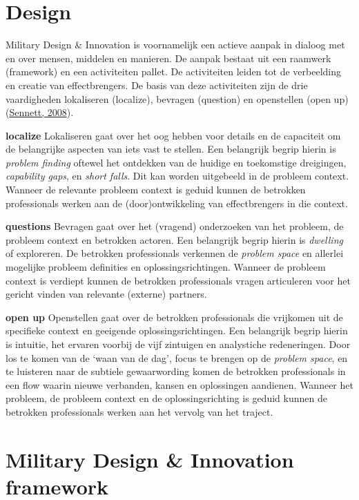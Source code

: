 \documentclass[
]{book}
\begin{document}
\hypertarget{design}{%
\section{Design}\label{design}}

Military Design \& Innovation is voornamelijk een actieve aanpak in dialoog met en over mensen, middelen en manieren. De aanpak bestaat uit een raamwerk (framework) en een activiteiten pallet. De activiteiten leiden tot de verbeelding en creatie van effectbrengers. De basis van deze activiteiten zijn de drie vaardigheden lokaliseren (localize), bevragen (question) en openstellen (open up) (\protect\hyperlink{ref-sennett_craftsman_2008}{Sennett, 2008}).

\textbf{localize}
Lokaliseren gaat over het oog hebben voor details en de capaciteit om de belangrijke aspecten van iets vast te stellen. Een belangrijk begrip hierin is \emph{problem finding} oftewel het ontdekken van de huidige en toekomstige dreigingen, \emph{capability gaps}, en \emph{short falls}. Dit kan worden uitgebeeld in de probleem context. Wanneer de relevante probleem context is geduid kunnen de betrokken professionals werken aan de (door)ontwikkeling van effectbrengers in die context.

\textbf{questions}
Bevragen gaat over het (vragend) onderzoeken van het probleem, de probleem context en betrokken actoren. Een belangrijk begrip hierin is \emph{dwelling} of exploreren. De betrokken professionals verkennen de \emph{problem space} en allerlei mogelijke probleem definities en oplossingsrichtingen. Wanneer de probleem context is verdiept kunnen de betrokken professionals vragen articuleren voor het gericht vinden van relevante (externe) partners.

\textbf{open up}
Openstellen gaat over de betrokken professionals die vrijkomen uit de specifieke context en geeigende oplossingsrichtingen. Een belangrijk begrip hierin is intuitie, het ervaren voorbij de vijf zintuigen en analystiche redeneringen. Door los te komen van de `waan van de dag', focus te brengen op de \emph{problem space}, en te luisteren naar de subtiele gewaarwording komen de betrokken professionals in een flow waarin nieuwe verbanden, kansen en oplossingen aandienen. Wanneer het probleem, de probleem context en de oplossingsrichting is geduid kunnen de betrokken professionals werken aan het vervolg van het traject.

\hypertarget{military-design-innovation-framework}{%
\section{Military Design \& Innovation framework}\label{military-design-innovation-framework}}
\end{document}
